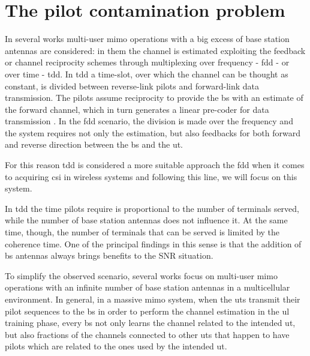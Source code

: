 \documentclass[11pt]{book}
\begin{document}
\section{The pilot contamination problem}
In several works multi-user \gls{mimo} operations with a big excess of base station antennas are considered: in them the channel is estimated exploiting the feedback or channel reciprocity schemes through multiplexing over frequency - \gls{fdd} - or over time - \gls{tdd}. In \gls{tdd} a time-slot, over which the channel can be thought as constant, is divided between reverse-link pilots and forward-link data transmission. The pilots assume reciprocity to provide the \gls{bs} with an estimate of the forward channel, which in turn generates a linear pre-coder for data transmission \cite{Marzetta2010}. In the \gls{fdd} scenario, the division is made over the frequency and the system requires not only the estimation, but also feedbacks for both forward and reverse direction between the \gls{bs} and the \gls{ut}.

For this reason \gls{tdd} is considered a more suitable approach the \gls{fdd} when it comes to acquiring \gls{csi} in wireless systems \cite{Elijah2016} and following this line, we will focus on this system.

In \gls{tdd} the time pilots require is proportional to the number of terminals served, while the number of base station antennas does not influence it. At the same time, though, the number of terminals that can be served is limited by the coherence time. One of the principal findings in this sense is that the addition of \gls{bs} antennas always brings benefits to the SNR situation.

To simplify the observed scenario, several works focus on multi-user \gls{mimo} operations with an infinite number of base station antennas in a multicellular environment. In general, in a massive \gls{mimo} system, when the \gls{ut}s transmit their pilot sequences to the \gls{bs} in order to perform the channel estimation in the \gls{ul} training phase, every \gls{bs} not only learns the channel related to the intended \gls{ut}, but also fractions of the channels connected to other \gls{ut}s that happen to have pilots which are related to the ones used by the intended \gls{ut}.

\end{document}
